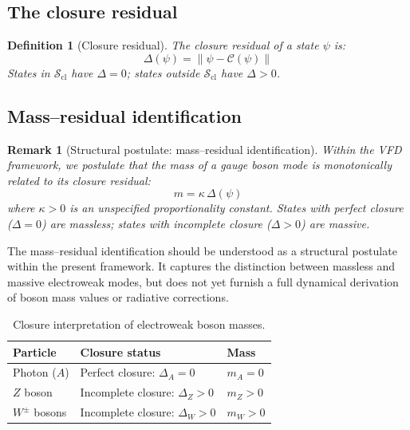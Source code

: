 \documentclass[12pt]{article}
\newtheorem{definition}[theorem]{Definition}
\newtheorem{remark}[theorem]{Remark}
\newcommand{\Ccal}{\mathcal{C}}
\begin{document}
\subsection{The closure residual}

\begin{definition}[Closure residual]\label{def:defect}
The closure residual of a state $\psi$ is:
\begin{equation}\label{eq:defect}
    \Delta(\psi) = \|\psi - \Ccal(\psi)\|
\end{equation}
States in $\mathcal{S}_{\mathrm{cl}}$ have $\Delta = 0$; states outside $\mathcal{S}_{\mathrm{cl}}$ have $\Delta > 0$.
\end{definition}

\subsection{Mass--residual identification}

\begin{remark}[Structural postulate: mass--residual identification]\label{rem:mass}
Within the VFD framework, we postulate that the mass of a gauge boson mode is monotonically related to its closure residual:
\begin{equation}\label{eq:massdefect}
    m = \kappa\, \Delta(\psi)
\end{equation}
where $\kappa > 0$ is an unspecified proportionality constant. States with perfect closure ($\Delta = 0$) are massless; states with incomplete closure ($\Delta > 0$) are massive.
\end{remark}

The mass--residual identification should be understood as a structural postulate within the present framework. It captures the distinction between massless and massive electroweak modes, but does not yet furnish a full dynamical derivation of boson mass values or radiative corrections.

\begin{table}[ht]
\centering
\caption{Closure interpretation of electroweak boson masses.}
\label{tab:massclosure}
\begin{tabular}{@{}lll@{}}
\toprule
Particle & Closure status & Mass \\
\midrule
Photon ($A$) & Perfect closure: $\Delta_A = 0$ & $m_A = 0$ \\
$Z$ boson & Incomplete closure: $\Delta_Z > 0$ & $m_Z > 0$ \\
$W^\pm$ bosons & Incomplete closure: $\Delta_W > 0$ & $m_W > 0$ \\
\bottomrule
\end{tabular}
\end{table}
\end{document}
